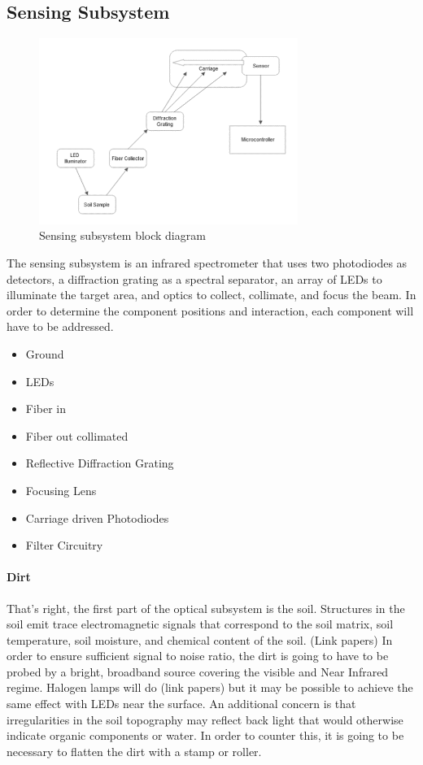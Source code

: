 \subsection{Sensing Subsystem}
\begin{figure}[H]
    \caption{Sensing subsystem block diagram}
    \centering
    \includegraphics[width=0.75\textwidth]{images/OpticsBlockDiagram.png}
\end{figure}


The sensing subsystem is an infrared spectrometer that uses two photodiodes as detectors, a diffraction grating as a spectral separator, an array of LEDs to illuminate the target area, and optics to collect, collimate, and focus the beam. In order to determine the component positions and interaction, each component will have to be addressed.
    \begin{itemize}
        \item Ground
        \item LEDs
        \item Fiber in
        \item Fiber out collimated
        \item Reflective Diffraction Grating
        \item Focusing Lens
        \item Carriage driven Photodiodes
        \item Filter Circuitry
    \end{itemize}


    \paragraph{Dirt}

That’s right, the first part of the optical subsystem is the soil. Structures in the soil emit trace electromagnetic signals that correspond to the soil matrix, soil temperature, soil moisture, and chemical content of the soil. (Link papers)
In order to ensure sufficient signal to noise ratio, the dirt is going to have to be probed by a bright, broadband source covering the visible and Near Infrared regime. Halogen lamps will do (link papers) but it may be possible to achieve the same effect with LEDs near the surface. 
An additional concern is that irregularities in the soil topography may reflect back light that would otherwise indicate organic components or water. In order to counter this, it is going to be necessary to flatten the dirt with a stamp or roller.


